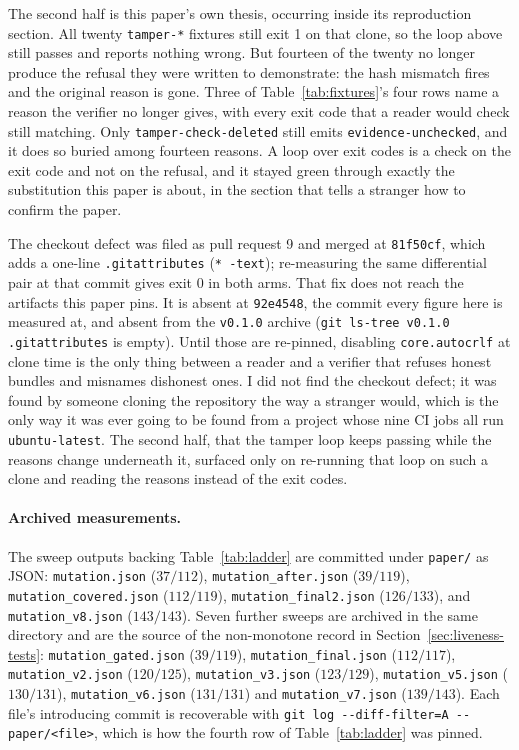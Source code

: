 \documentclass[11pt]{article}
\begin{document}
The second half is this paper's own thesis, occurring inside its reproduction section. All
twenty \texttt{tamper-*} fixtures still exit 1 on that clone, so the loop above still passes and
reports nothing wrong. But fourteen of the twenty no longer produce the refusal they were
written to demonstrate: the hash mismatch fires and the original reason is gone. Three of
Table~\ref{tab:fixtures}'s four rows name a reason the verifier no longer gives, with every exit
code that a reader would check still matching. Only \texttt{tamper-check-deleted} still emits
\texttt{evidence-unchecked}, and it does so buried among fourteen reasons. A loop over exit codes
is a check on the exit code and not on the refusal, and it stayed green through exactly the
substitution this paper is about, in the section that tells a stranger how to confirm the paper.

The checkout defect was filed as pull request 9 and merged at \texttt{81f50cf}, which adds a
one-line \texttt{.gitattributes} (\texttt{* -text}); re-measuring the same differential pair at
that commit gives exit 0 in both arms. That fix does not reach the artifacts this paper pins. It
is absent at \texttt{92e4548}, the commit every figure here is measured at, and absent from the
\texttt{v0.1.0} archive (\texttt{git ls-tree v0.1.0 .gitattributes} is empty). Until those are
re-pinned, disabling \texttt{core.autocrlf} at clone time is the only thing between a reader and
a verifier that refuses honest bundles and misnames dishonest ones. I did not find the checkout
defect; it was found by someone cloning the repository the way a stranger would, which is the
only way it was ever going to be found from a project whose nine CI jobs all run
\texttt{ubuntu-latest}. The second half, that the tamper loop keeps passing while the reasons
change underneath it, surfaced only on re-running that loop on such a clone and reading the
reasons instead of the exit codes.

\paragraph{Archived measurements.} The sweep outputs backing Table~\ref{tab:ladder} are
committed under \texttt{paper/} as JSON: \texttt{mutation.json} ($37/112$),
\texttt{mutation\_after.json} ($39/119$), \texttt{mutation\_covered.json} ($112/119$),
\texttt{mutation\_final2.json} ($126/133$), and \texttt{mutation\_v8.json} ($143/143$). Seven
further sweeps are archived in the same directory and are the source of the non-monotone
record in Section~\ref{sec:liveness-tests}: \texttt{mutation\_gated.json} ($39/119$),
\texttt{mutation\_final.json} ($112/117$), \texttt{mutation\_v2.json} ($120/125$),
\texttt{mutation\_v3.json} ($123/129$), \texttt{mutation\_v5.json} ($130/131$),
\texttt{mutation\_v6.json} ($131/131$) and \texttt{mutation\_v7.json} ($139/143$). Each file's
introducing commit is recoverable with \texttt{git log -{}-diff-filter=A -{}- paper/<file>},
which is how the fourth row of Table~\ref{tab:ladder} was pinned.
\end{document}
